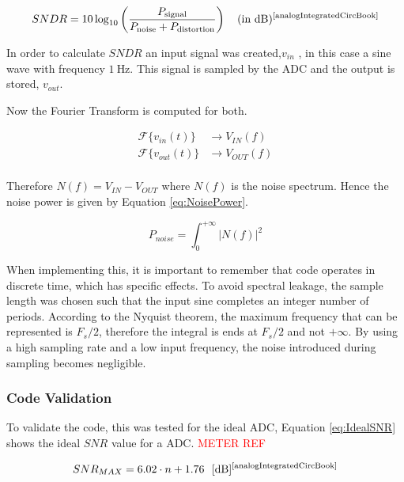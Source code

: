 \begin{equation}
    SNDR = 10 \log_{10} \left( \frac{P_{\text{signal}}}{P_{\text{noise}} + P_{\text{distortion}}} \right)  \quad \text{(in dB)} \textsuperscript{\cite{analogIntegratedCircBook}}
    \label{eq:SNDR}
\end{equation}

In order to calculate $SNDR$ an input signal was created,$v_{in}$ , in this case a sine wave with frequency $\SI{1}{\hertz}$. This signal is sampled by the ADC and the output is stored, $v_{out}$.

Now the Fourier Transform is computed for both.

\begin{equation}
    \begin{split}
        \mathcal{F}\{v_{in}(t)\} &\rightarrow V_{IN}(f)\\
        \mathcal{F}\{v_{out}(t)\} &\rightarrow V_{OUT}(f)\\
    \end{split}
    \label{eq:fourier}
\end{equation}

Therefore $N(f) = V_{IN} - V_{OUT}$ where $N(f)$ is the noise spectrum. Hence the noise power is given by Equation \ref{eq:NoisePower}.

\begin{equation}
    P_{noise} = \int_{0}^{+\infty}|N(f)|^2 
    \label{eq:NoisePower}
\end{equation}

When implementing this, it is important to remember that code operates in discrete time, which has specific effects.  To avoid spectral leakage, the sample length was chosen such that the input sine completes an integer number of periods. According to the Nyquist theorem, the maximum frequency that can be represented is $F_s/2$, therefore the integral is ends at $F_s/2$ and not $+\infty$. By using a high sampling rate and a low input frequency, the noise introduced during sampling becomes negligible.

\subsubsection{Code Validation}

To validate the code, this was tested for the ideal ADC, Equation \ref{eq:IdealSNR} shows the ideal $SNR$ value for a ADC. \textcolor{red}{METER REF}

\begin{equation}
    SNR_{MAX} = 6.02\cdot n+1.76~~[\si{\decibel}] \textsuperscript{\cite{analogIntegratedCircBook}}
    \label{eq:IdealSNR}
\end{equation}

